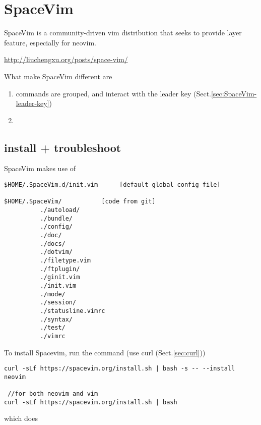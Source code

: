 \section{SpaceVim}
\label{sec:SpaceVim}

SpaceVim is a community-driven vim distribution that seeks to provide layer
feature, especially for neovim.

\url{http://liuchengxu.org/posts/space-vim/}

What make SpaceVim different are
\begin{enumerate}
  \item commands are grouped, and interact with the leader key
  (Sect.\ref{sec:SpaceVim-leader-key})
  
  \item
\end{enumerate}

\subsection{install + troubleshoot}
\label{sec:spacevim-install}

SpaceVim makes use of 
\begin{verbatim}
$HOME/.SpaceVim.d/init.vim      [default global config file]

$HOME/.SpaceVim/           [code from git]
          ./autoload/
          ./bundle/
          ./config/
          ./doc/
          ./docs/
          ./dotvim/
          ./filetype.vim
          ./ftplugin/
          ./ginit.vim
          ./init.vim
          ./mode/
          ./session/
          ./statusline.vimrc
          ./syntax/
          ./test/
          ./vimrc
\end{verbatim}

To install Spacevim, run the command (use curl (Sect.\ref{sec:curl})) 
\begin{verbatim}
curl -sLf https://spacevim.org/install.sh | bash -s -- --install neovim 

 //for both neovim and vim
curl -sLf https://spacevim.org/install.sh | bash

\end{verbatim}
which does

